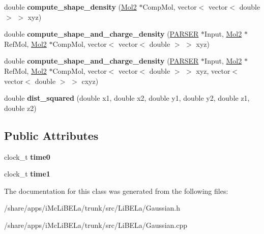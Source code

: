\begin{DoxyCompactItemize}
\item 
\hypertarget{classGaussian_a5b038af926d8a733608e41cdf263241a}{
double {\bfseries compute\_\-shape\_\-density} (\hyperlink{classMol2}{Mol2} $\ast$CompMol, vector$<$ vector$<$ double $>$ $>$ xyz)}
\label{classGaussian_a5b038af926d8a733608e41cdf263241a}

\item 
\hypertarget{classGaussian_a8857ef51d7fcf5d7248037c080cef452}{
double {\bfseries compute\_\-shape\_\-and\_\-charge\_\-density} (\hyperlink{classPARSER}{PARSER} $\ast$Input, \hyperlink{classMol2}{Mol2} $\ast$RefMol, \hyperlink{classMol2}{Mol2} $\ast$CompMol, vector$<$ vector$<$ double $>$ $>$ xyz)}
\label{classGaussian_a8857ef51d7fcf5d7248037c080cef452}

\item 
\hypertarget{classGaussian_a0416a0d61e5c76be78f08a239243563e}{
double {\bfseries compute\_\-shape\_\-and\_\-charge\_\-density} (\hyperlink{classPARSER}{PARSER} $\ast$Input, \hyperlink{classMol2}{Mol2} $\ast$RefMol, \hyperlink{classMol2}{Mol2} $\ast$CompMol, vector$<$ vector$<$ double $>$ $>$ xyz, vector$<$ vector$<$ double $>$ $>$ cxyz)}
\label{classGaussian_a0416a0d61e5c76be78f08a239243563e}

\item 
\hypertarget{classGaussian_ae9535543b557e8481b3b7ad1e559d4c0}{
double {\bfseries dist\_\-squared} (double x1, double x2, double y1, double y2, double z1, double z2)}
\label{classGaussian_ae9535543b557e8481b3b7ad1e559d4c0}

\end{DoxyCompactItemize}
\subsection*{Public Attributes}
\begin{DoxyCompactItemize}
\item 
\hypertarget{classGaussian_a32d5fa91e8452f5d333b8cd7f4e588f6}{
clock\_\-t {\bfseries time0}}
\label{classGaussian_a32d5fa91e8452f5d333b8cd7f4e588f6}

\item 
\hypertarget{classGaussian_aac68a2973eaa8d40f218fe64e025093b}{
clock\_\-t {\bfseries time1}}
\label{classGaussian_aac68a2973eaa8d40f218fe64e025093b}

\end{DoxyCompactItemize}


The documentation for this class was generated from the following files:\begin{DoxyCompactItemize}
\item 
/share/apps/iMcLiBELa/trunk/src/LiBELa/Gaussian.h\item 
/share/apps/iMcLiBELa/trunk/src/LiBELa/Gaussian.cpp\end{DoxyCompactItemize}
